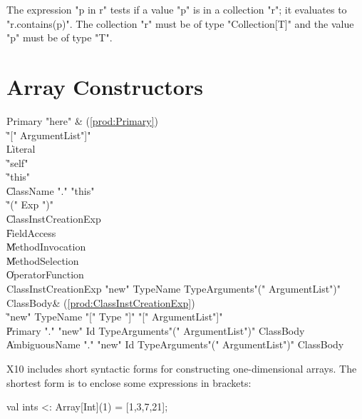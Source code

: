 The expression \xcd"p in r" tests if a value \xcd"p" is in a collection
\xcd"r"; it evaluates to \xcd"r.contains(p)".
The collection \xcd"r"
must be of type \xcd"Collection[T]" and the value \xcd"p" must
be of type \xcd"T".

\section{Array Constructors}
\label{sect:ArrayCtors}

\begin{bbgrammar}
             Primary \: \xcd"here" & (\ref{prod:Primary}) \\
                    \| \xcd"[" ArgumentList\opt \xcd"]" \\
                    \| Literal \\
                    \| \xcd"self" \\
                    \| \xcd"this" \\
                    \| ClassName \xcd"." \xcd"this" \\
                    \| \xcd"(" Exp \xcd")" \\
                    \| ClassInstCreationExp \\
                    \| FieldAccess \\
                    \| MethodInvocation \\
                    \| MethodSelection \\
                    \| OperatorFunction \\
ClassInstCreationExp \: \xcd"new" TypeName TypeArguments\opt \xcd"(" ArgumentList\opt \xcd")" ClassBody\opt & (\ref{prod:ClassInstCreationExp}) \\
                    \| \xcd"new" TypeName \xcd"[" Type \xcd"]" \xcd"[" ArgumentList\opt \xcd"]" \\
                    \| Primary \xcd"." \xcd"new" Id TypeArguments\opt \xcd"(" ArgumentList\opt \xcd")" ClassBody\opt \\
                    \| AmbiguousName \xcd"." \xcd"new" Id TypeArguments\opt \xcd"(" ArgumentList\opt \xcd")" ClassBody\opt \\
\end{bbgrammar}

X10 includes short syntactic forms for constructing one-dimensional arrays.
The shortest form is to enclose some expressions in brackets: 
\begin{xten}
val ints <: Array[Int](1) = [1,3,7,21];
\end{xten}

